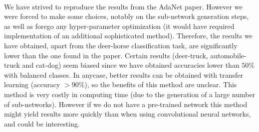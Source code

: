 \documentclass[11 pt]{article}
\begin{document}
\paragraph{}We have strived to reproduce the results from the AdaNet paper. However we were forced to make some choices, notably on the sub-network generation steps, as well as forego any hyper-parameter optimization (it would have required implementation of an additional sophisticated method). Therefore, the results we have obtained, apart from the deer-horse classification task, are significantly lower than the one found in the paper. Certain results (deer-truck, automobile-truck and cat-dog) seem biased since we have obtained accuracies lower than \(50\%\) with balanced classes. In anycase, better results can be obtained with transfer learning (accuracy \(> 90\%\)), so the benefits of this method are unclear. This method is very costly in computing time (due to the generation of a large number of sub-networks). However if we do not have a pre-trained network this method might yield results more quickly than when using convolutional  neural networks, and could be interesting.
\end{document}
